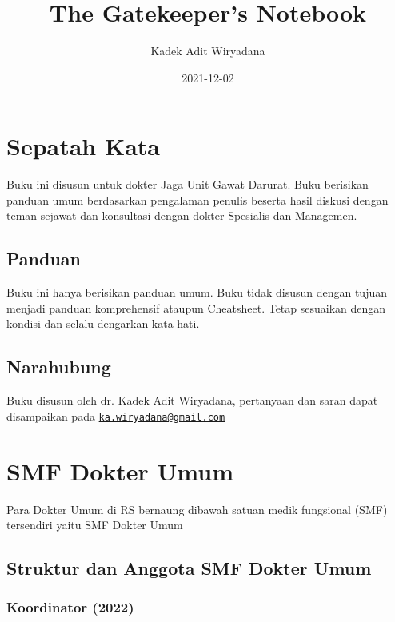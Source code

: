\documentclass[
]{book}
\title{The Gatekeeper's Notebook}
\author{Kadek Adit Wiryadana}
\date{2021-12-02}
\begin{document}
\maketitle

{
\setcounter{tocdepth}{1}
\tableofcontents
}
\hypertarget{sepatah-kata}{%
\chapter{Sepatah Kata}\label{sepatah-kata}}

Buku ini disusun untuk dokter Jaga Unit Gawat Darurat. Buku berisikan panduan umum berdasarkan pengalaman penulis beserta hasil diskusi dengan teman sejawat dan konsultasi dengan dokter Spesialis dan Managemen.

\hypertarget{panduan}{%
\section{Panduan}\label{panduan}}

Buku ini hanya berisikan panduan umum. Buku tidak disusun dengan tujuan menjadi panduan komprehensif ataupun Cheatsheet. Tetap sesuaikan dengan kondisi dan selalu dengarkan kata hati.

\hypertarget{narahubung}{%
\section{Narahubung}\label{narahubung}}

Buku disusun oleh dr. Kadek Adit Wiryadana, pertanyaan dan saran dapat disampaikan pada \href{mailto:ka.wiryadana@gmail.com}{\nolinkurl{ka.wiryadana@gmail.com}}

\hypertarget{smf-dokter-umum}{%
\chapter{SMF Dokter Umum}\label{smf-dokter-umum}}

Para Dokter Umum di RS bernaung dibawah satuan medik fungsional (SMF) tersendiri yaitu SMF Dokter Umum

\hypertarget{struktur-dan-anggota-smf-dokter-umum}{%
\section{Struktur dan Anggota SMF Dokter Umum}\label{struktur-dan-anggota-smf-dokter-umum}}

\hypertarget{koordinator-2022}{%
\subsection{Koordinator (2022)}\label{koordinator-2022}}
\end{document}
